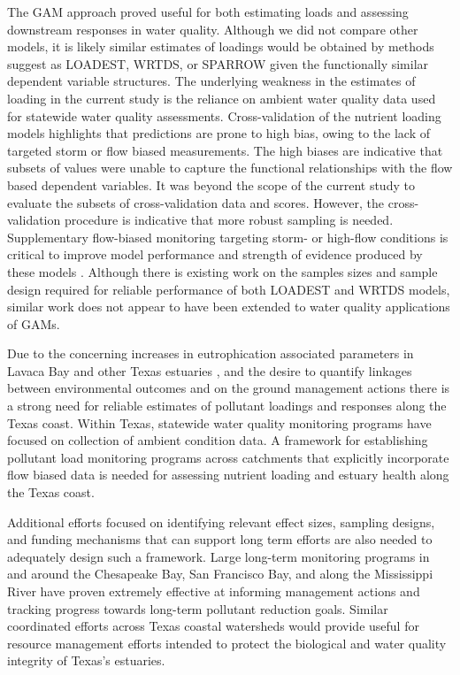 \documentclass[fleqn,10pt,lineno]{wlpeerj} %
\begin{document}
The GAM approach proved useful for both estimating loads and assessing
downstream responses in water quality. Although we did not compare other
models, it is likely similar estimates of loadings would be obtained by
methods suggest as LOADEST, WRTDS, or SPARROW given the functionally
similar dependent variable structures. The underlying weakness in the
estimates of loading in the current study is the reliance on ambient
water quality data used for statewide water quality assessments.
Cross-validation of the nutrient loading models highlights that
predictions are prone to high bias, owing to the lack of targeted storm
or flow biased measurements. The high biases are indicative that subsets
of values were unable to capture the functional relationships with the
flow based dependent variables. It was beyond the scope of the current
study to evaluate the subsets of cross-validation data and scores.
However, the cross-validation procedure is indicative that more robust
sampling is needed. Supplementary flow-biased monitoring targeting
storm- or high-flow conditions is critical to improve model performance
and strength of evidence produced by these models
\autocite{horowitzEvaluationSedimentRating2003,snelderEstimationCatchmentNutrient2017}.
Although there is existing work on the samples sizes and sample design
required for reliable performance of both LOADEST
\autocite{parkUsePollutantLoad2014} and WRTDS
\autocite{kumarValueIntensiveSampling2019} models, similar work does not
appear to have been extended to water quality applications of GAMs.

Due to the concerning increases in eutrophication associated parameters
in Lavaca Bay and other Texas estuaries \autocite{bugica_water_2020},
and the desire to quantify linkages between environmental outcomes and
on the ground management actions \autocite{schrammTotalMaximumDaily2022}
there is a strong need for reliable estimates of pollutant loadings and
responses along the Texas coast. Within Texas, statewide water quality
monitoring programs have focused on collection of ambient condition
data. A framework for establishing pollutant load monitoring programs
across catchments that explicitly incorporate flow biased data is needed
for assessing nutrient loading and estuary health along the Texas coast.

Additional efforts focused on identifying relevant effect sizes,
sampling designs, and funding mechanisms that can support long term
efforts are also needed to adequately design such a framework. Large
long-term monitoring programs in and around the Chesapeake Bay, San
Francisco Bay, and along the Mississippi River have proven extremely
effective at informing management actions and tracking progress towards
long-term pollutant reduction goals. Similar coordinated efforts across
Texas coastal watersheds would provide useful for resource management
efforts intended to protect the biological and water quality integrity
of Texas's estuaries.
\end{document}
